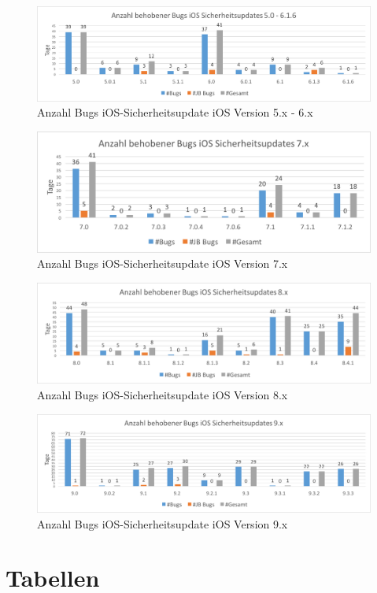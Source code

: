 \begin{figure}[htbp]
        \centering
                \includegraphics[scale=0.55]{Bilder/iOSSicherheitsupdate5.png}
        \caption{Anzahl Bugs iOS-Sicherheitsupdate iOS Version 5.x - 6.x}
        \label{fig:AnalyseiOSSicherheitsupdate5}
\end{figure}

\begin{figure}[htbp]
        \centering
                \includegraphics[scale=0.7]{Bilder/iOSSicherheitsupdate7.png}
        \caption{Anzahl Bugs iOS-Sicherheitsupdate iOS Version 7.x}
        \label{fig:AnalyseiOSSicherheitsupdate7}
\end{figure}

\begin{figure}[htbp]
        \centering
                \includegraphics[scale=0.6]{Bilder/iOSSicherheitsupdate8.png}
        \caption{Anzahl Bugs iOS-Sicherheitsupdate iOS Version 8.x}
        \label{fig:AnalyseiOSSicherheitsupdate8}
\end{figure}

\begin{figure}[htbp]
        \centering
                \includegraphics[scale=0.55]{Bilder/iOSSicherheitsupdate9.png}
        \caption{Anzahl Bugs iOS-Sicherheitsupdate iOS Version 9.x}
        \label{fig:AnalyseiOSSicherheitsupdate9}
\end{figure}


\newpage
\chapter{Tabellen}

